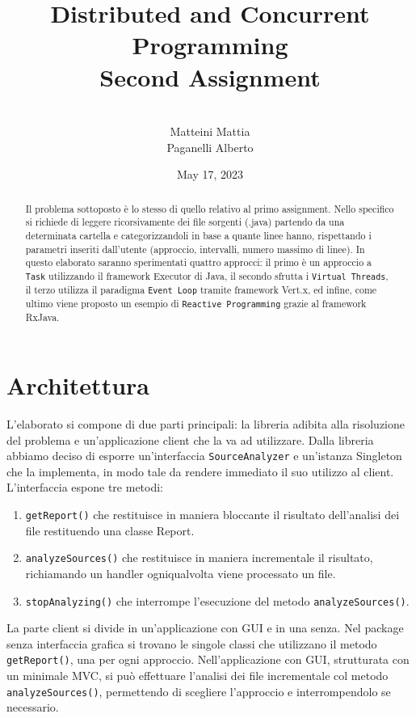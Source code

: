 \documentclass{article}
\title{\textbf{Distributed and Concurrent Programming}\\ Second Assignment}
\author{
    \\Matteini Mattia
    \\Paganelli Alberto
}
\date{May 17, 2023}
\begin{document}
    \maketitle

    \begin{abstract}
        Il problema sottoposto è lo stesso di quello relativo al primo assignment.
        Nello specifico si richiede di leggere ricorsivamente dei file sorgenti (.java) partendo da una determinata cartella e categorizzandoli in base a quante linee hanno, rispettando i parametri inseriti dall'utente (approccio, intervalli, numero massimo di linee).
        In questo elaborato saranno sperimentati quattro approcci: il primo è un approccio a \texttt{Task} utilizzando il framework Executor di Java, il secondo sfrutta i \texttt{Virtual Threads}, il terzo utilizza il paradigma \texttt{Event Loop} tramite framework Vert.x, ed infine, come ultimo viene proposto un esempio di \texttt{Reactive Programming} grazie al framework RxJava.


    \end{abstract}


    \section{Architettura}
    L’elaborato si compone di due parti principali: la libreria adibita alla risoluzione del problema e un'applicazione client che la va ad utilizzare.
    Dalla libreria abbiamo deciso di esporre un'interfaccia \texttt{SourceAnalyzer} e un’istanza Singleton che la implementa, in modo tale da rendere immediato il suo utilizzo al client.
    \\
    L’interfaccia espone tre metodi:

    \begin{enumerate}
        \item \texttt{getReport()} che restituisce in maniera bloccante il risultato dell’analisi dei file restituendo una classe Report.
        \item \texttt{analyzeSources()} che restituisce in maniera incrementale il risultato, richiamando un handler ogniqualvolta viene processato un file.
        \item \texttt{stopAnalyzing()} che interrompe l’esecuzione del metodo \texttt{analyzeSources()}.
    \end{enumerate}

    La parte client si divide in un’applicazione con GUI e in una senza.
    Nel package senza interfaccia grafica si trovano le singole classi che utilizzano il metodo \texttt{getReport()}, una per ogni approccio.
    Nell'applicazione con GUI, strutturata con un minimale MVC, si può effettuare l’analisi dei file incrementale col metodo \texttt{analyzeSources()}, permettendo di scegliere l’approccio e interrompendolo se necessario.
\end{document}
